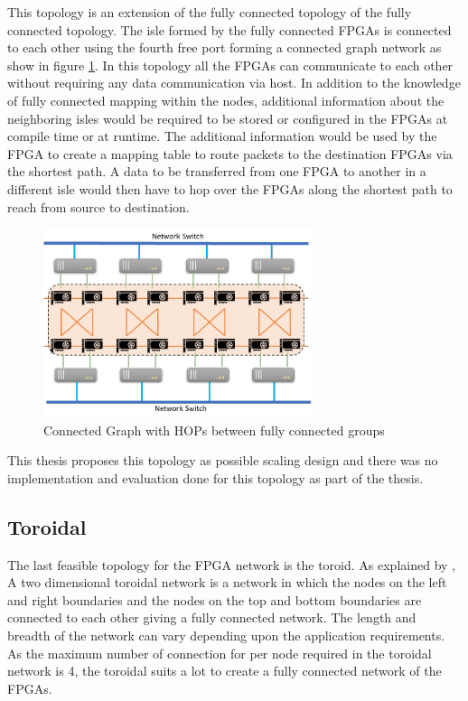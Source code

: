 This topology is an extension of the fully connected topology of the fully
connected topology. The isle formed by the fully connected FPGAs is connected
to each other using the fourth free port forming a connected graph network
as show in figure \ref{fig:connected_graph}.
In this topology all the FPGAs can communicate to each other without requiring
any data communication via host. In addition to the knowledge of fully
connected mapping within the nodes, additional information about the neighboring
isles would be required to be stored or configured in the FPGAs at compile time
or at runtime. The additional information would be used by the FPGA to create
a mapping table to route packets to the destination FPGAs via the shortest path.
A data to be transferred from one FPGA to another in a different isle would
then have to hop over the FPGAs along the shortest path to reach
from source to destination.

\begin{figure}[h]%
    \centering
    \includegraphics[width=0.7\textwidth]{images/connected_graph}
    \caption{Connected Graph with HOPs between fully connected groups}
    \label{fig:connected_graph}
\end{figure}

This thesis proposes this topology as possible scaling design and there was no
implementation and evaluation done for this topology as part of the thesis.

\subsection{Toroidal}
\label{sec:toroidal}

The last feasible topology for the FPGA network is the toroid. As explained by
\textcite{robertazzi_toroidal_1988}, A two dimensional toroidal network is
a network in which the nodes on the left and right boundaries and the
nodes on the top and bottom boundaries are connected to each other giving
a fully connected network. The length and breadth of the network can vary
depending upon the application requirements. As the maximum number of
connection for per node required in the toroidal network is 4, the toroidal
suits a lot to create a fully connected network of the FPGAs.

